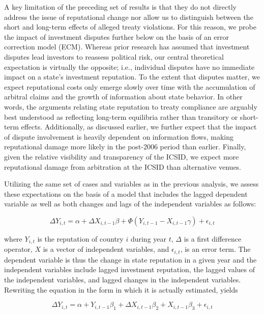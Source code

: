 \documentclass[12pt,onesided]{amsart}
\begin{document}
A key limitation of the preceding set of results is that they do not directly address the issue of reputational change nor allow us to distinguish between the short and long-term effects of alleged treaty violations. For this reason, we probe the impact of investment disputes further below on the basis of an error correction model (ECM). Whereas prior research has assumed that investment disputes lead investors to reassess political risk, our central theoretical expectation is virtually the opposite; i.e., individual disputes have no immediate impact on a state's investment reputation. To the extent that disputes matter, we expect reputational costs only emerge slowly over time with the accumulation of arbitral claims and the growth of information about state behavior. In other words, the arguments relating state reputation to treaty compliance are arguably best understood as reflecting long-term equilibria rather than transitory or short-term effects. Additionally, as discussed earlier, we further expect that the impact of dispute involvement is heavily dependent on information flows, making reputational damage more likely in the post-2006 period than earlier. Finally, given the relative visibility and transparency of the ICSID, we expect more reputational damage from arbitration at the ICSID than alternative venues.

Utilizing the same set of cases and variables as in the previous analysis, we assess these expectations on the basis of a model that includes the lagged dependent variable as well as both changes and lags of the independent variables as follows:

\begin{equation}
\Delta Y_{i,t} = \alpha + \Delta X_{i,t-1} \beta + \Phi(Y_{i,t-1} - X_{i,t-1} \gamma) + \epsilon_{i,t}
\end{equation}

where $Y_{i,t}$ is the reputation of country $i$ during year $t$, $\Delta$ is a first difference operator, $X$ is a vector of independent variables, and $\epsilon_{i,t}$, is an error term. The dependent variable is thus the change in state reputation in a given year and the independent variables include lagged investment reputation, the lagged values of the independent variables, and lagged changes in the independent variables. Rewriting the equation in the form in which it is actually estimated, yields

\begin{equation}
\Delta Y_{i,t} = \alpha + Y_{i,t-1} \beta_{1} + \Delta X_{i,t-1} \beta_{2} + X_{i, t-1} \beta_{3} + \epsilon_{i,t}
\end{equation}
\end{document}
